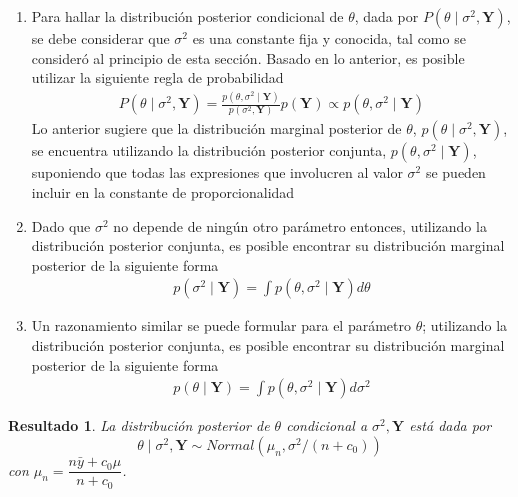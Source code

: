 \documentclass[
  10pt,
  spanish,
]{book}
\providecommand{\tightlist}{%
  \setlength{\itemsep}{0pt}\setlength{\parskip}{0pt}}
\newtheorem{proposition}{Resultado}[chapter]
\theoremstyle{definition}
\theoremstyle{definition}
\theoremstyle{definition}
\theoremstyle{definition}
\theoremstyle{remark}
\begin{document}
\begin{enumerate}
\def\labelenumi{\arabic{enumi}.}
\tightlist
\item
  Para hallar la distribución posterior condicional de \(\theta\), dada por \(P(\theta \mid \sigma^2,\mathbf{Y})\), se debe considerar que \(\sigma^2\) es una constante fija y conocida, tal como se consideró al principio de esta sección. Basado en lo anterior, es posible utilizar la siguiente regla de probabilidad
  \begin{align*}
  P(\theta \mid \sigma^2,\mathbf{Y})=\frac{p(\theta,\sigma^2 \mid \mathbf{Y})}{p(\sigma^2,\mathbf{Y})}p(\mathbf{Y})\propto p(\theta,\sigma^2 \mid \mathbf{Y})
  \end{align*}
  Lo anterior sugiere que la distribución marginal posterior de \(\theta\), \(p(\theta \mid \sigma^2,\mathbf{Y})\), se encuentra utilizando la distribución posterior conjunta, \(p(\theta,\sigma^2 \mid \mathbf{Y})\), suponiendo que todas las expresiones que involucren al valor \(\sigma^2\) se pueden incluir en la constante de proporcionalidad
\item
  Dado que \(\sigma^2\) no depende de ningún otro parámetro entonces, utilizando la distribución posterior conjunta, es posible encontrar su distribución marginal posterior de la siguiente forma
  \begin{align*}
  p(\sigma^2 \mid \mathbf{Y})=\int p(\theta,\sigma^2 \mid \mathbf{Y}) d\theta
  \end{align*}
\item
  Un razonamiento similar se puede formular para el parámetro \(\theta\); utilizando la distribución posterior conjunta, es posible encontrar su distribución marginal posterior de la siguiente forma
  \begin{align*}
  p(\theta \mid \mathbf{Y})=\int p(\theta,\sigma^2 \mid \mathbf{Y}) d\sigma^2
  \end{align*}
\end{enumerate}

\begin{proposition}
\protect\hypertarget{prp:unnamed-chunk-14}{}{\label{prp:unnamed-chunk-14} }La distribución posterior de \(\theta\) condicional a \(\sigma^2,\mathbf{Y}\) está dada por
\begin{equation*}
\theta \mid \sigma^2,\mathbf{Y} \sim Normal(\mu_n,\sigma^2/(n+c_0))
\end{equation*}
con \(\mu_n=\dfrac{n\bar{y}+c_0\mu}{n+c_0}\).
\end{proposition}
\end{document}
